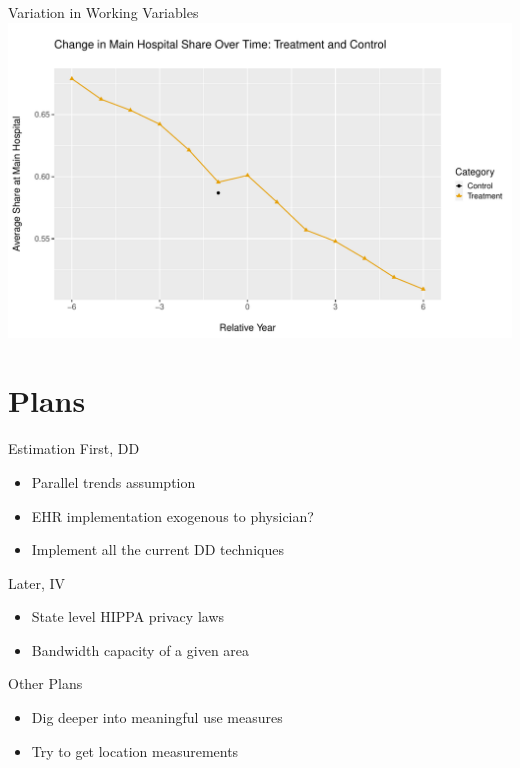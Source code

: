 \documentclass[10pt]{beamer}
\begin{document}
\begin{frame}{Variation in Working Variables}
    \centering
    \includegraphics[scale=.4]{Objects/rel_mainhosp_share_treatvscontrol.pdf}
\end{frame}




\section{Plans}

\begin{frame}{Estimation}
First, DD
\begin{itemize}
    \item Parallel trends assumption
    \item EHR implementation exogenous to physician?
    \item Implement all the current DD techniques
\end{itemize}

Later, IV
\begin{itemize}
    \item State level HIPPA privacy laws
    \item Bandwidth capacity of a given area
\end{itemize}
\end{frame}

\begin{frame}{Other Plans}
\begin{itemize}
    \item Dig deeper into meaningful use measures
    \item Try to get location measurements
\end{itemize}
    
\end{frame}
\end{document}

